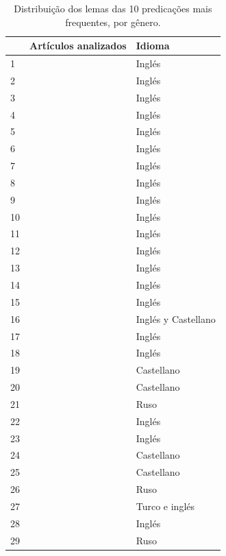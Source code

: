 \documentclass[spanish]{textolivre}
\begin{document}
\begin{table}[htbp]
\begin{threeparttable}
\centering
\caption{Distribuição dos lemas das 10 predicações mais frequentes, por gênero.}
\label{tbl1}
\begin{tabular}{l >{\raggedright\arraybackslash}p{10cm} l}
\toprule
& Artículos analizados & Idioma \\ 
\midrule
1 & \textcite{isrokatun2022digital} & Inglés \\ 
2 & \textcite{ogegbo2021assessment} & Inglés \\
3 & \textcite{takavarasha2018navigating} & Inglés \\
4 & \textcite{mark2021invitation} & Inglés \\
5 & \textcite{mahadir_digital_2021} & Inglés \\
6 & \textcite{escoda_digital_2021} & Inglés \\
7 & \textcite{jwaifell2018proper} & Inglés \\
8 & \textcite{hazar2018digital} & Inglés \\
9 & \textcite{schlebbe2018selecting} & Inglés \\
10 & \textcite{kaban2020secure} & Inglés \\
11 & \textcite{baeva2020safety} & Inglés \\
12 & \textcite{torres2022indicators} & Inglés \\
13 & \textcite{potyrała2021teachers} & Inglés \\
14 & \textcite{quintana2020transmedia} & Inglés \\
15 & \textcite{soldatova2020digital} & Inglés \\
16 & \textcite{hinojo-lucena_sharenting:_2020} & Inglés y Castellano \\
17 & \textcite{thoma_communication_2019} & Inglés \\
18 & \textcite{chelysheva2017basic} & Inglés \\
19 & \textcite{arrufat2019competence} & Castellano \\
20 & \textcite{torres2019intervencion} & Castellano \\
21 & \textcite{filkina_profiles_2023} & Ruso \\
22 & \textcite{stiakakis_exploring_2022} & Inglés \\
23 & \textcite{tomczyk_parents_2021} & Inglés \\
24 & \textcite{garcia-gutierrez_aproximacion_2013} & Castellano \\
25 & \textcite{alonso-ferreiro_actitudes_2019} & Castellano \\
26 & \textcite{skobeltsina_russian_2021} & Ruso \\
27 & \textcite{tomczyk_parents_2017} & Turco e inglés \\
28 & \textcite{martinez-de-morentin_risks_2021} & Inglés \\
29 & \textcite{soldatova_parental_2019} & Ruso \\
\bottomrule
\end{tabular}
\end{threeparttable}
\end{table}
\end{document}
